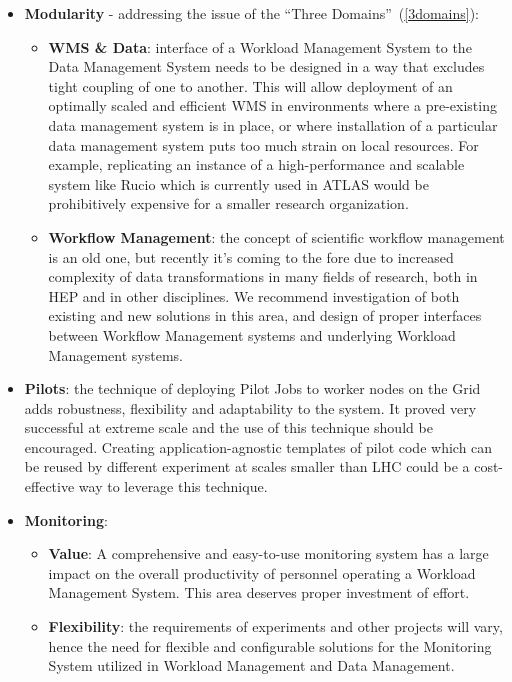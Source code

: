 \begin{itemize}

\item \textbf{Modularity} - addressing the issue of the ``Three Domains''~(\ref{3domains}):
\begin{itemize}
\item \textbf{WMS \& Data}: interface of a Workload Management System to the Data Management System needs to be designed in a way that
excludes tight coupling of one to another. This will allow deployment of an optimally scaled and efficient WMS in environments where a pre-existing
data management  system is in place, or where installation of a particular data management system puts too much strain on local resources. For example,
replicating an instance of a high-performance and scalable system like Rucio which is currently used in ATLAS would be prohibitively expensive for
a smaller research organization.

\item \textbf{Workflow Management}: the concept of scientific workflow management is an old one, but recently it's coming to the fore due to
increased complexity of data transformations in many fields of research, both in HEP and in other disciplines. We recommend investigation of both existing
and new solutions in this area, and design of proper interfaces between Workflow Management systems and underlying Workload Management systems.

\end{itemize}

\item \textbf{Pilots}: the technique of deploying Pilot Jobs to worker nodes on the Grid adds robustness, flexibility and adaptability to the system.
It proved very successful at extreme scale and the use of this technique should be encouraged. Creating application-agnostic templates of pilot code
which can be reused by different experiment at scales smaller than LHC could be a cost-effective way to leverage this technique.

\item \textbf{Monitoring}:
\begin{itemize}
\item \textbf{Value}: A comprehensive and easy-to-use monitoring system has a large impact on the overall productivity of personnel operating a Workload Management System.
This area deserves proper investment of effort.

\item \textbf{Flexibility}: the requirements of experiments and other projects will vary, hence the need for flexible and configurable solutions
for the Monitoring System utilized in Workload Management and Data Management.


\end{itemize}
\end{itemize}
